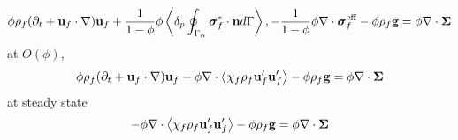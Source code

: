 \begin{equation}
    \phi  \rho_f(\partial_t + \textbf{u}_f  \cdot \mathbf{\nabla}) \textbf{u}_f
    + \frac{1}{1-\phi}\phi \left<\delta_{p} \oint_{\Gamma_{\alpha}} \bm\sigma_f^{*}\cdot \textbf{n} d\Gamma\right>, 
     - \frac{1}{1-\phi}\phi \mathbf{\nabla}\cdot \bm\sigma_f^{\text{eff}}
     - \phi 
     \rho_f \textbf{g}
    = \phi  
    \mathbf{\nabla}\cdot \bm{\Sigma}
\end{equation}
at $O(\phi)$,
\begin{equation}
    \phi  \rho_f(\partial_t + \textbf{u}_f  \cdot \mathbf{\nabla}) \textbf{u}_f
     - \phi \mathbf{\nabla}\cdot \left<\chi_f\rho_f \textbf{u}_f'\textbf{u}_f'\right> 
     - \phi 
     \rho_f \textbf{g}
    = \phi  
    \mathbf{\nabla}\cdot \bm{\Sigma}
\end{equation}
at steady state
\begin{equation}
     - \phi \mathbf{\nabla}\cdot \left<\chi_f\rho_f \textbf{u}_f'\textbf{u}_f'\right> 
     - \phi 
     \rho_f \textbf{g}
    = \phi  
    \mathbf{\nabla}\cdot \bm{\Sigma}
\end{equation}

